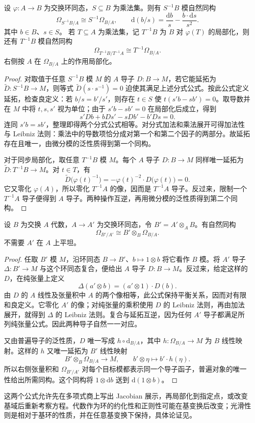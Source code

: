 \begin{proposition}\label{b3:prop:differential-localization}
	设 \(\varphi:A\to B\) 为交换环同态，\(S\subseteq B\) 为乘法集。则有 \(S^{-1}B\) 模自然同构
	\[
		\Omega_{S^{-1}B/A}\cong S^{-1}\Omega_{B/A}, \qquad \mathrm{d}(b/s)=\dfrac{\mathrm{d}b}{s}-\dfrac{b\cdot\mathrm{d}s}{s^2}.
	\]
	其中 \(b\in B\)、\(s\in S\)。 若 \(T\subseteq A\) 为乘法集，记 \(T^{-1}B\) 为 \(B\) 对 \(\varphi(T)\) 的局部化，则还有 \(T^{-1}B\) 模自然同构
	\[
		\Omega_{T^{-1}B/T^{-1}A}\cong T^{-1}\Omega_{B/A}.
	\]
	右侧按 \(A\) 在 \(\Omega_{B/A}\) 上的作用局部化。
\end{proposition}
\begin{proof}
	对取值于任意 \(S^{-1}B\) 模 \(M\) 的 \(A\) 导子 \(D:B\rightarrow M\)，若它能延拓为 \(\widetilde D:S^{-1}B\to M\)，则等式 \(\widetilde D(s\cdot s^{-1})=0\) 迫使其满足上述分式公式。按此公式定义延拓，检查良定义：若 \(b/s=b'/s'\)，则存在 \(t\in S\) 使 \(t(s'b-sb')=0\)。取导数并在 \(M\) 中将 \(t,s,s'\) 视为单位；由于 \(s'b-sb'=0\) 在局部化后成立，得到
	\[
		s'Db+bDs'-sDb'-b'Ds=0.
	\]
	连同 \(s'b=sb'\)，整理即得两个分式公式相等。对分式加法和乘法展开可得加法性与 Leibniz 法则：乘法中的导数项恰分成对第一个和第二个因子的两部分。故延拓存在且唯一，由微分模的泛性质得到第一个同构。

	对于同步局部化，取任意 \(T^{-1}B\) 模 \(M\)。每个 \(A\) 导子 \(D:B\to M\) 同样唯一延拓为 \(\widetilde D:T^{-1}B\to M\)。对 \(t\in T\)，有
	\[
		\widetilde D\bigl(\varphi(t)^{-1}\bigr) =-\varphi(t)^{-2}\cdot D\bigl(\varphi(t)\bigr)=0.
	\]
	它又零化 \(\varphi(A)\)，所以零化 \(T^{-1}A\) 的像，因而是 \(T^{-1}A\) 导子。反过来，限制一个 \(T^{-1}A\) 导子便得到 \(A\) 导子。两种操作互逆，再用微分模的泛性质得到第二个同构。
\end{proof}

\begin{proposition}\label{b3:prop:differential-base-change}
	设 \(B\) 为交换 \(A\) 代数，\(A\to A'\) 为交换环同态，令 \(B'=A'\otimes_AB\)。有自然同构
	\[
		\Omega_{B'/A'}\cong B'\otimes_B\Omega_{B/A}.
	\]
	不需要 \(A'\) 在 \(A\) 上平坦。
\end{proposition}
\begin{proof}
	任取 \(B'\) 模 \(M\)，沿环同态 \(B\to B'\)、\(b\mapsto1\otimes b\) 将它看作 \(B\) 模。将 \(A'\) 导子 \(\Delta:B'\to M\) 与这个环同态复合，便给出 \(A\) 导子 \(D:B\to M\)。反过来，给定这样的 \(D\)，在纯张量上定义
	\[
		\Delta(a'\otimes b)=(a'\otimes1)\cdot D(b).
	\]
	由 \(D\) 的 \(A\) 线性及张量积中 \(A\) 的两个像相等，此公式保持平衡关系，因而对有限和良定义。它零化 \(A'\) 的像；对纯张量的乘积使用 \(D\) 的 Leibniz 法则，再由加法展开，就得到 \(\Delta\) 的 Leibniz 法则。复合与延拓互逆，因为任何 \(A'\) 导子都满足所列纯张量公式。因此两种导子自然一一对应。

	又由普遍导子的泛性质，\(D\) 唯一写成 \(h\circ\mathrm{d}_{B/A}\)，其中 \(h:\Omega_{B/A}\to M\) 为 \(B\) 线性映射。这样的 \(h\) 又唯一延拓为 \(B'\) 线性映射
	\[
		B'\otimes_B\Omega_{B/A}\longrightarrow M, \qquad b'\otimes\eta\longmapsto b'\cdot h(\eta).
	\]
	所以右侧张量积和 \(\Omega_{B'/A'}\) 对每个目标模都表示同一个导子函子，普遍对象的唯一性给出所需同构。这个同构将 \(1\otimes\mathrm{d}b\) 送到 \(\mathrm{d}(1\otimes b)\)。
\end{proof}

这两个公式允许先在多项式商上写出 Jacobian 展示，再局部化到指定点，或改变基域后重新考察方程。代数作为环的约化性和正则性可能在基变换后改变；光滑性则是相对于基环的性质，并在任意基变换下保持，具体论证见。
